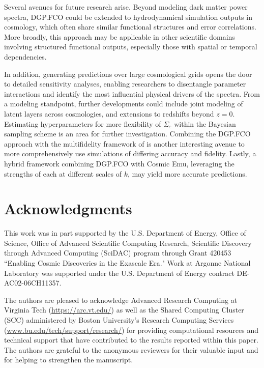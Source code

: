 \documentclass[11pt]{article}
\begin{document}
Several avenues for future research arise. Beyond modeling dark matter power 
spectra, DGP.FCO could be extended to hydrodynamical simulation outputs in cosmology, which 
often share similar functional structures and error correlations. More broadly, this approach may be 
applicable in other scientific domains involving structured functional outputs, especially those 
with spatial or temporal dependencies.

In addition, generating predictions over large cosmological grids opens the door to detailed 
sensitivity analyses, enabling researchers to disentangle parameter interactions and identify 
the most influential physical drivers of the spectra. From a modeling standpoint, further 
developments could include joint modeling of latent layers across cosmologies, and extensions 
to redshifts beyond $z=0$. Estimating hyperparameters for more flexibility of $\Sigma_\varepsilon$ 
within the Bayesian sampling scheme is an area for further investigation. 
Combining the DGP.FCO approach with the multifidelity framework of \cite{ho2023mfbox} 
is another interesting avenue to more comprehensively use simulations of differing 
accuracy and fidelity. Lastly, a hybrid framework combining DGP.FCO with Cosmic Emu, leveraging 
the strengths of each at different scales of $k$, may yield more accurate predictions.

\section{Acknowledgments}
\label{sec:ack}

This work was in part supported by the U.S. Department
of Energy, Office of Science, Office of Advanced Scientific Computing Research, 
Scientific Discovery through Advanced Computing (SciDAC) program through 
Grant 420453 ``Enabling Cosmic Discoveries in the Exascale Era." Work at Argonne 
National Laboratory was supported under the U.S. Department of Energy 
contract DE-AC02-06CH11357.

The authors are pleased to acknowledge Advanced Research Computing at Virginia Tech 
(\url{https://arc.vt.edu/}) as well as the Shared Computing Cluster (SCC) administered
by Boston University's Research Computing Services (\url{www.bu.edu/tech/support/research/})
for providing computational resources and technical support that have contributed 
to the results reported within this paper.
The authors are grateful to the anonymous reviewers for their valuable input and 
for helping to strengthen the manuscript.
\end{document}
